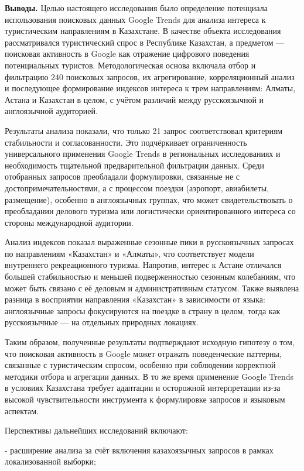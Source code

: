 \begin{multicols}{2}
{\bfseries Выводы.} Целью настоящего исследования было определение
потенциала использования поисковых данных Google Trends для анализа
интереса к туристическим направлениям в Казахстане. В качестве объекта
исследования рассматривался туристический спрос в Республике Казахстан,
а предметом --- поисковая активность в Google как отражение цифрового
поведения потенциальных туристов. Методологическая основа включала отбор
и фильтрацию 240 поисковых запросов, их агрегирование, корреляционный
анализ и последующее формирование индексов интереса к трем направлениям:
Алматы, Астана и Казахстан в целом, с учётом различий между
русскоязычной и англоязычной аудиторией.

Результаты анализа показали, что только 21 запрос соответствовал
критериям стабильности и согласованности. Это подчёркивает
ограниченность универсального применения Google Trends в региональных
исследованиях и необходимость тщательной предварительной фильтрации
данных. Среди отобранных запросов преобладали формулировки, связанные не
с достопримечательностями, а с процессом поездки (аэропорт, авиабилеты,
размещение), особенно в англоязычных группах, что может
свидетельствовать о преобладании делового туризма или логистически
ориентированного интереса со стороны международной аудитории.

Анализ индексов показал выраженные сезонные пики в русскоязычных
запросах по направлениям «Казахстан» и «Алматы», что соответствует
модели внутреннего рекреационного туризма. Напротив, интерес к Астане
отличался большей стабильностью и меньшей подверженностью сезонным
колебаниям, что может быть связано с её деловым и административным
статусом. Также выявлена разница в восприятии направления «Казахстан» в
зависимости от языка: англоязычные запросы фокусируются на поездке в
страну в целом, тогда как русскоязычные --- на отдельных природных
локациях.

Таким образом, полученные результаты подтверждают исходную гипотезу о
том, что поисковая активность в Google может отражать поведенческие
паттерны, связанные с туристическим спросом, особенно при соблюдении
корректной методики отбора и агрегации данных. В то же время применение
Google Trends в условиях Казахстана требует адаптации и осторожной
интерпретации из-за высокой чувствительности инструмента к формулировке
запросов и языковым аспектам.

Перспективы дальнейших исследований включают:

- расширение анализа за счёт включения казахоязычных запросов в рамках
локализованной выборки;


\end{multicols}
